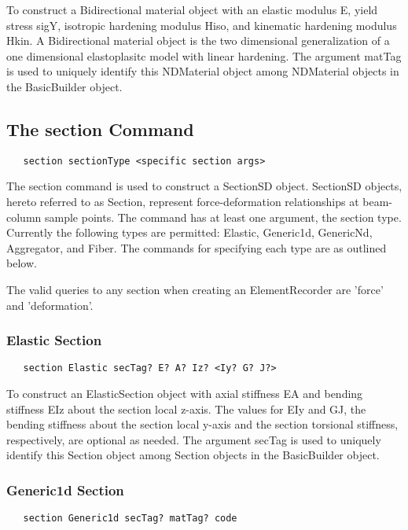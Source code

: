 \documentclass[12pt]{article}
\begin{document}
To construct a Bidirectional material object with an elastic modulus
E, yield stress sigY, isotropic hardening modulus Hiso, and kinematic
hardening modulus Hkin. A Bidirectional material object is the two
dimensional generalization of a one dimensional elastoplasitc model
with linear hardening.
The argument matTag is used to
uniquely identify this NDMaterial object among NDMaterial objects
in the BasicBuilder object.

\subsection{The section Command}
{\sf\small
\begin{verbatim}
   section sectionType <specific section args>
\end{verbatim}
}

The section command is used to construct a SectionSD object. SectionSD
objects, hereto referred to as Section, represent force-deformation
relationships at beam-column sample points. The command has at least
one argument, the section type. Currently the following types are
permitted: Elastic, Generic1d, GenericNd, Aggregator, and Fiber. The
commands for specifying each type are as outlined below.

The valid queries to any section when creating an ElementRecorder
are 'force' and 'deformation'.

\subsubsection{Elastic Section}
{\sf\small
\begin{verbatim}
   section Elastic secTag? E? A? Iz? <Iy? G? J?>
\end{verbatim}
}

To construct an ElasticSection object with axial stiffness EA and 
bending stiffness EIz about the section local z-axis. The values 
for EIy and GJ, the bending stiffness about the section local
y-axis and the section torsional stiffness, respectively, are optional
as needed. The argument secTag is used to uniquely identify this 
Section object among Section objects in the BasicBuilder object.

\subsubsection{Generic1d Section}
{\sf\small
\begin{verbatim}
   section Generic1d secTag? matTag? code
\end{verbatim}
}
\end{document}
